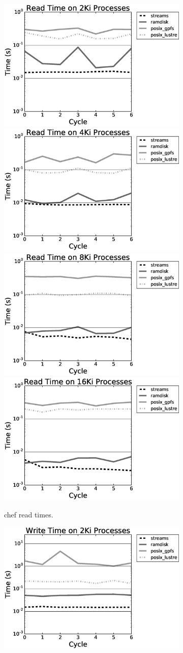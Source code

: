 \begin{figure} \centering
  \begin{subfigure}{.90\textwidth}
    \includegraphics[width=.49\textwidth]{results/phasta-dambreak/theta/chef2048read.eps}
    \includegraphics[width=.49\textwidth]{results/phasta-dambreak/theta/chef4096read.eps}
    \includegraphics[width=.49\textwidth]{results/phasta-dambreak/theta/chef8192read.eps}
    \includegraphics[width=.49\textwidth]{results/phasta-dambreak/theta/chef16384read.eps}
    \caption{chef read times.}
    \label{fig:chefread}
  \end{subfigure}
  \begin{subfigure}{.90\textwidth}
    \includegraphics[width=.49\textwidth]{results/phasta-dambreak/theta/chef2048write.eps}

\end{subfigure}
\end{figure}
